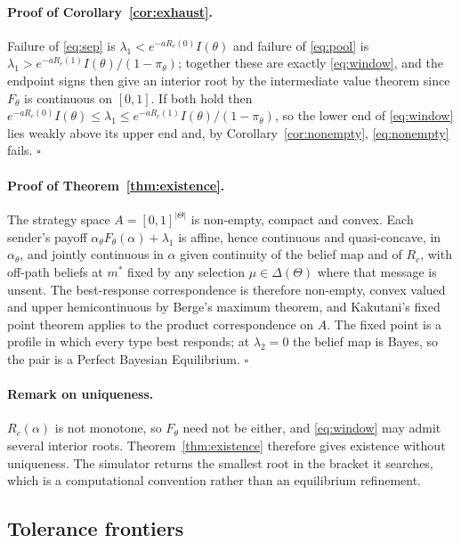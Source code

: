 \documentclass[sigconf,review]{acmart}
\begin{document}
\paragraph{Proof of Corollary~\ref{cor:exhaust}.}
Failure of \eqref{eq:sep} is $\lambda_1<e^{-aR_c(0)}I(\theta)$ and failure of
\eqref{eq:pool} is $\lambda_1>e^{-aR_c(1)}I(\theta)/(1-\pi_\theta)$; together these are
exactly \eqref{eq:window}, and the endpoint signs then give an interior root by the
intermediate value theorem since $F_\theta$ is continuous on $[0,1]$. If both hold then
$e^{-aR_c(0)}I(\theta)\le\lambda_1\le e^{-aR_c(1)}I(\theta)/(1-\pi_\theta)$, so the lower
end of \eqref{eq:window} lies weakly above its upper end and, by
Corollary~\ref{cor:nonempty}, \eqref{eq:nonempty} fails. \hfill$\square$

\paragraph{Proof of Theorem~\ref{thm:existence}.}
The strategy space $A=[0,1]^{|\Theta|}$ is non-empty, compact and convex. Each sender's
payoff $\alpha_\theta F_\theta(\alpha)+\lambda_1$ is affine, hence continuous and
quasi-concave, in $\alpha_\theta$, and jointly continuous in $\alpha$ given continuity of
the belief map and of $R_c$, with off-path beliefs at $m^{*}$ fixed by any selection
$\mu\in\Delta(\Theta)$ where that message is unsent. The best-response correspondence is
therefore non-empty, convex valued and upper hemicontinuous by Berge's maximum theorem, and
Kakutani's fixed point theorem applies to the product correspondence on $A$. The fixed
point is a profile in which every type best responds; at $\lambda_2=0$ the belief map is
Bayes, so the pair is a Perfect Bayesian Equilibrium. \hfill$\square$

\paragraph{Remark on uniqueness.}
$R_c(\alpha)$ is not monotone, so $F_\theta$ need not be either, and \eqref{eq:window} may
admit several interior roots. Theorem~\ref{thm:existence} therefore gives existence without
uniqueness. The simulator returns the smallest root in the bracket it searches, which is a
computational convention rather than an equilibrium refinement.

\subsection{Tolerance frontiers}
\end{document}
